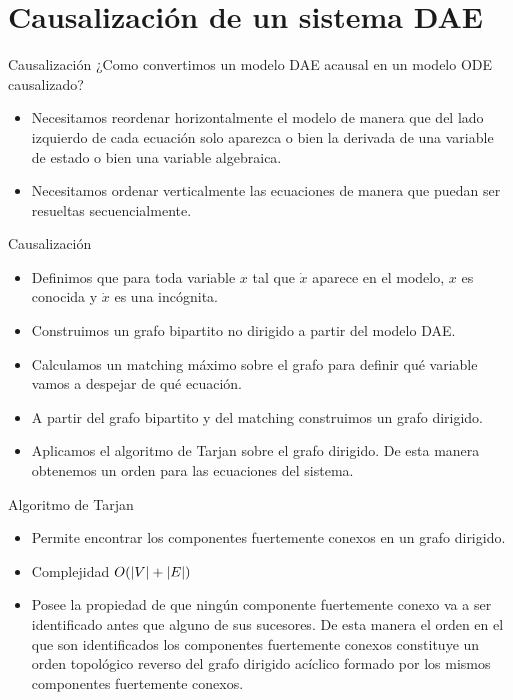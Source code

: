 \section{Causalización de un sistema DAE}

\begin{frame}{Causalización}
    ¿Como convertimos un modelo DAE acausal en un modelo ODE causalizado?
    \pause
    \begin{itemize}
        \item<2-> Necesitamos reordenar horizontalmente el modelo de manera que del lado izquierdo de cada ecuación solo aparezca o bien la derivada de una variable de estado o bien una variable algebraica.
        \item<3-> Necesitamos ordenar verticalmente las ecuaciones de manera que puedan ser resueltas secuencialmente.
    \end{itemize}
\end{frame}

\begin{frame}{Causalización}
    \begin{itemize}
        \item<1-> Definimos que para toda variable $x$ tal que $\dot{x}$ aparece en el modelo, $x$ es conocida y $\dot{x}$ es una incógnita.
        \item<2-> Construimos un grafo bipartito no dirigido a partir del modelo DAE.
        \item<3-> Calculamos un matching máximo sobre el grafo para definir qué variable vamos a despejar de qué ecuación.
        \item<4-> A partir del grafo bipartito y del matching construimos un grafo dirigido.
        \item<5-> Aplicamos el algoritmo de Tarjan sobre el grafo dirigido. De esta manera obtenemos un orden para las ecuaciones del sistema.
    \end{itemize}
\end{frame}

\begin{frame}{Algoritmo de Tarjan}
    \begin{itemize}
        \item<1-> Permite encontrar los componentes fuertemente conexos en un grafo dirigido.
        \item<2-> Complejidad $O(\lvert V\rvert+\lvert E\rvert)$
        \item<3-> Posee la propiedad de que ningún componente fuertemente conexo va a ser identificado antes que alguno de sus sucesores. De esta manera el orden en el que son identificados los componentes fuertemente conexos constituye un orden topológico reverso del grafo dirigido acíclico formado por los mismos componentes fuertemente conexos.
    \end{itemize}
\end{frame}

